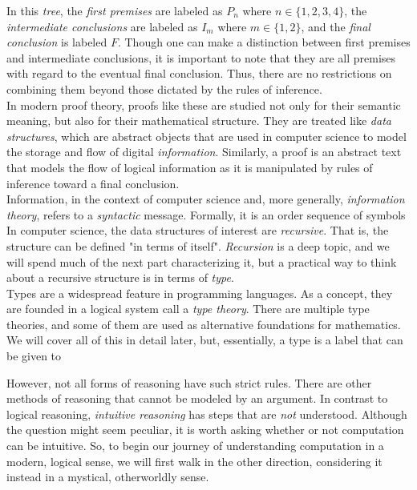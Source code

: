 In this \textit{tree}, the \textit{first premises} are labeled as $P_n$ where $n\in\{1,2,3,4\}$, the \textit{intermediate conclusions} are labeled as $I_m$ where $m\in\{1,2\}$, and the \textit{final conclusion} is labeled $F$. Though one can make a distinction between first premises and intermediate conclusions, it is important to note that they are all premises with regard to the eventual final conclusion. Thus, there are no restrictions on combining them beyond those dictated by the rules of inference. \\

In modern proof theory, proofs like these are studied not only for their semantic meaning, but also for their mathematical structure. They are treated like \textit{data structures}, which are abstract objects that are used in computer science to model the storage and flow of digital \textit{information}. Similarly, a proof is an abstract text that models the flow of logical information as it is manipulated by rules of inference toward a final conclusion. \\

Information, in the context of computer science and, more generally, \textit{information theory}, refers to a \textit{syntactic} message. Formally, it is an order sequence of symbols \\


In computer science, the data structures of interest are \textit{recursive}. That is, the structure can be defined "in terms of itself". \textit{Recursion} is a deep topic, and we will spend much of the next part characterizing it, but a practical way to think about a recursive structure is in terms of \textit{type}. \\

Types are a widespread feature in programming languages. As a concept, they are founded in a logical system call a \textit{type theory}. There are multiple type theories, and some of them are used as alternative foundations for mathematics. We will cover all of this in detail later, but, essentially, a type is a label that can be given to 


However, not all forms of reasoning have such strict rules. There are other methods of reasoning that cannot be modeled by an argument. In contrast to logical reasoning, \textit{intuitive reasoning} has steps that are \textit{not} understood. Although the question might seem peculiar, it is worth asking whether or not computation can be intuitive. So, to begin our journey of understanding computation in a modern, logical sense, we will first walk in the other direction, considering it instead in a mystical, otherworldly sense. \\

